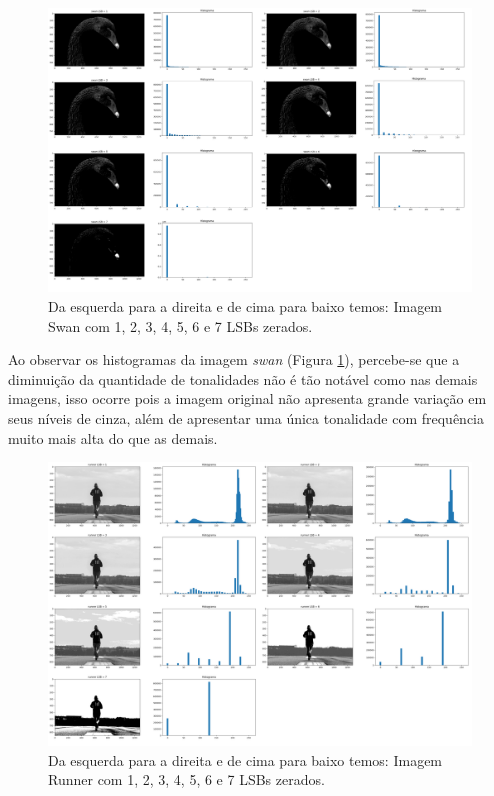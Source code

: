 \begin{figure}[h!]
    \includegraphics[width=1\linewidth]{Elementos//Figuras/swan_lsb.png}
    \caption{Da esquerda para a direita e de cima para baixo temos: Imagem Swan com 1, 2, 3, 4, 5, 6 e 7 LSBs zerados.}
    \label{fig:swan-lsb}
\end{figure}

Ao observar os histogramas da imagem \textit{swan} (Figura \ref{fig:swan-lsb}), percebe-se que a diminuição da quantidade de tonalidades não é tão notável como nas demais imagens, isso ocorre pois a imagem original não apresenta grande variação em seus níveis de cinza, além de apresentar uma única tonalidade com frequência muito mais alta do que as demais.

\begin{figure}[h!]
    \includegraphics[width=1\linewidth]{Elementos//Figuras/runner_lsb.png}
    \caption{Da esquerda para a direita e de cima para baixo temos: Imagem Runner com 1, 2, 3, 4, 5, 6 e 7 LSBs zerados.}
    \label{fig:runner-lsb}
\end{figure}

